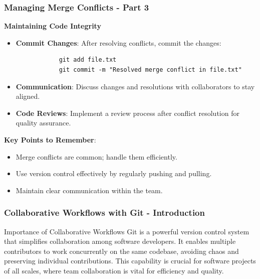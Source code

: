 \documentclass{beamer}
\begin{document}
\begin{frame}[fragile]
    \frametitle{Managing Merge Conflicts - Part 3}

    \textbf{Maintaining Code Integrity}
    \begin{itemize}
        \item \textbf{Commit Changes}:
            After resolving conflicts, commit the changes:
            \begin{lstlisting}
            git add file.txt
            git commit -m "Resolved merge conflict in file.txt"
            \end{lstlisting}

        \item \textbf{Communication}:
            Discuss changes and resolutions with collaborators to stay aligned.

        \item \textbf{Code Reviews}:
            Implement a review process after conflict resolution for quality assurance.
    \end{itemize}

    \textbf{Key Points to Remember}:
    \begin{itemize}
        \item Merge conflicts are common; handle them efficiently.
        \item Use version control effectively by regularly pushing and pulling.
        \item Maintain clear communication within the team.
    \end{itemize}
\end{frame}

\begin{frame}[fragile]
    \frametitle{Collaborative Workflows with Git - Introduction}
    \begin{block}{Importance of Collaborative Workflows}
        Git is a powerful version control system that simplifies collaboration among software developers. 
        It enables multiple contributors to work concurrently on the same codebase, avoiding chaos and preserving individual contributions. 
        This capability is crucial for software projects of all scales, where team collaboration is vital for efficiency and quality.
    \end{block}
\end{frame}
\end{document}
